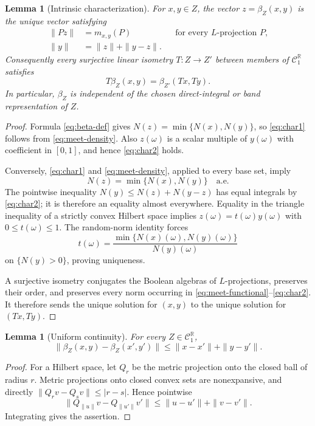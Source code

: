 \documentclass[11pt]{article}
\newcommand{\C}{\mathcal C}
\newcommand{\R}{\mathbb R}
\newcommand{\1}{\mathbf 1}
\newtheorem{lemma}[theorem]{Lemma}
\theoremstyle{definition}
\theoremstyle{remark}
\begin{document}
\begin{lemma}[Intrinsic characterization]
\label{lem:beta-intrinsic}
For $x,y\in Z$, the vector $z=\beta_Z(x,y)$ is the unique vector satisfying
\begin{align}
 \|Pz\|&=m_{x,y}(P)
          &&\text{for every $L$-projection $P$,}
 \label{eq:char1}\\
 \|y\|&=\|z\|+\|y-z\|.
 \label{eq:char2}
\end{align}
Consequently every surjective linear isometry $T:Z\to Z'$ between members
of $\C_1^{\R}$ satisfies
\[
                  T\beta_Z(x,y)=\beta_{Z'}(Tx,Ty).
\]
In particular, $\beta_Z$ is independent of the chosen direct-integral or
band representation of $Z$.
\end{lemma}

\begin{proof}
Formula \eqref{eq:beta-def} gives
$N(z)=\min\{N(x),N(y)\}$, so \eqref{eq:char1} follows from
\eqref{eq:meet-density}.  Also $z(\omega)$ is a scalar multiple of
$y(\omega)$ with coefficient in $[0,1]$, and hence \eqref{eq:char2} holds.

Conversely, \eqref{eq:char1} and \eqref{eq:meet-density}, applied to every
base set, imply
\[
                       N(z)=\min\{N(x),N(y)\}
                       \quad\text{a.e.}
\]
The pointwise inequality
$N(y)\leq N(z)+N(y-z)$ has equal integrals by \eqref{eq:char2}; it is
therefore an equality almost everywhere.  Equality in the triangle
inequality of a strictly convex Hilbert space implies
$z(\omega)=t(\omega)y(\omega)$ with $0\leq t(\omega)\leq1$.  The random-norm
identity forces
\[
       t(\omega)=\frac{\min\{N(x)(\omega),N(y)(\omega)\}}{N(y)(\omega)}
\]
on $\{N(y)>0\}$, proving uniqueness.

A surjective isometry conjugates the Boolean algebras of $L$-projections,
preserves their order, and preserves every norm occurring in
\eqref{eq:meet-functional}--\eqref{eq:char2}.  It therefore sends the unique
solution for $(x,y)$ to the unique solution for $(Tx,Ty)$.
\end{proof}

\begin{lemma}[Uniform continuity]
\label{lem:beta-Lipschitz}
For every $Z\in\C_1^{\R}$,
\[
 \|\beta_Z(x,y)-\beta_Z(x',y')\|
       \leq \|x-x'\|+\|y-y'\|.
\]
\end{lemma}

\begin{proof}
For a Hilbert space, let $Q_r$ be the metric projection onto the closed ball
of radius $r$.  Metric projections onto closed convex sets are
nonexpansive, and directly
$\|Q_rv-Q_sv\|\leq|r-s|$.  Hence pointwise
\[
 \|Q_{\|u\|}v-Q_{\|u'\|}v'\|
 \leq \|u-u'\|+\|v-v'\|.
\]
Integrating gives the assertion.
\end{proof}
\end{document}
